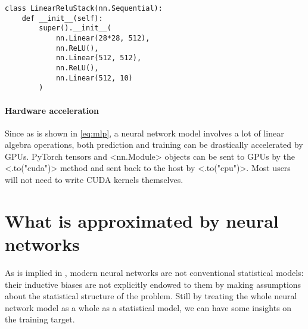 \documentclass[hyperref, a4paper, 12pt]{report}
\def\texttt#1{<#1>}%
\newcommand{\shortcode}[1]{\texttt{#1}}
\begin{document}
\begin{lstlisting}
class LinearReluStack(nn.Sequential):
    def __init__(self):
        super().__init__(
            nn.Linear(28*28, 512),
            nn.ReLU(),
            nn.Linear(512, 512),
            nn.ReLU(),
            nn.Linear(512, 10)
        )
\end{lstlisting}

\paragraph*{Hardware acceleration}
Since as is shown in \eqref{eq:mlp}, a neural network model involves a lot of linear algebra operations,
both prediction and training can be drastically accelerated by GPUs.
PyTorch tensors and \shortcode{nn.Module} objects can be sent to GPUs
by the \shortcode{.to("cuda")} method and sent back to the host by \shortcode{.to("cpu")}.
Most users will not need to write CUDA kernels themselves.

\section{What is approximated by neural networks}\label{sec:framework.statistics}

As is implied in ,
modern neural networks are not conventional statistical models:
their inductive biases are not explicitly endowed to them by making assumptions about the statistical structure of the problem.
Still by treating the whole neural network model as a whole as a statistical model,
we can have some insights on the training target. 
\end{document}
